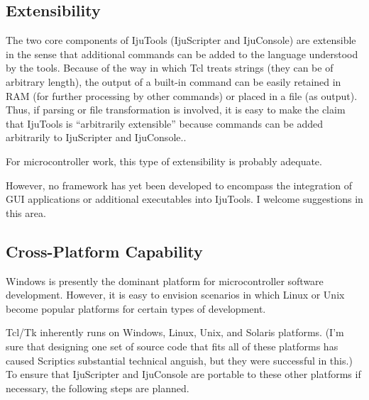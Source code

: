 \subsection{Extensibility}

The two core components of IjuTools (IjuScripter and IjuConsole) are extensible in the
sense that additional commands can be added to the language understood by the tools.
Because of the way in which Tcl treats strings (they can be of arbitrary length), the output
of a built-in command can be easily retained in RAM (for further processing by other
commands) or placed in a file (as output).
Thus, if parsing or file transformation is involved, it is easy to make the claim that
IjuTools is ``arbitrarily extensible'' because commands can be added arbitrarily to IjuScripter
and IjuConsole..

For microcontroller work, this type of extensibility is probably adequate.

However, no framework has yet been developed to encompass the integration of 
GUI applications or additional executables into IjuTools.  I welcome suggestions
in this area.

\subsection{Cross-Platform Capability}

Windows is presently the dominant platform for microcontroller software
development.  However, it is easy to envision scenarios in which Linux or Unix become
popular platforms for certain types of development.

Tcl/Tk inherently runs on Windows, Linux, Unix, and Solaris platforms.
(I'm sure that designing one set of source code that fits all of these
platforms has caused Scriptics substantial technical anguish, but they
were successful in this.)  To ensure that IjuScripter and IjuConsole are
portable to these other platforms if necessary, the following steps
are planned.


